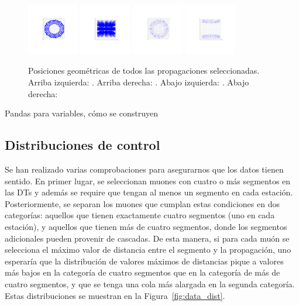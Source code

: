 \begin{figure}
\centering
\includegraphics[width=0.2\textwidth]{figures/Props_DT_xy_postCleaning.png}
\includegraphics[width=0.2\textwidth]{figures/Props_DT_xz_boarders.png}
\includegraphics[width=0.2\textwidth]{figures/Props_CSC_xy_boarders.png}
\includegraphics[width=0.2\textwidth]{figures/Props_CSC_xz_boarders.png}
\caption{Posiciones geom\'etricas de todos las propagaciones seleccionadas. Arriba izquierda: . Arriba derecha: . Abajo izquierda: . Abajo derecha: }
\label{fig:props_pos}
\end{figure}


Pandas para variables, c\'omo se construyen


\subsection{Distribuciones de control}\label{sec:plots}

Se han realizado varias comprobaciones para asegurarnos que los datos tienen sentido. En primer lugar, se seleccionan muones con cuatro o m\'as segmentos en las DTs y adem\'as se require que tengan al menos un segmento en cada estaci\'on. Posteriormente, se separan los muones que cumplan estas condiciones en dos categor\'ias: aquellos que tienen exactamente cuatro segmentos (uno en cada estaci\'on), y aquellos que tienen m\'as de cuatro segmentos, donde los segmentos adicionales pueden provenir de cascadas. De esta manera, si para cada mu\'on se selecciona el m\'aximo valor de distancia entre el segmento y la propagaci\'on, uno esperar\'ia que la distribuci\'on de valores m\'aximos de distancias pique a valores m\'as bajos en la categor\'ia de cuatro segmentos que en la categor\'ia de m\'as de cuatro segmentos, y que se tenga una cola m\'as alargada en la segunda categor\'ia. Estas distribuciones se muestran en la Figura~\ref{fig:data_dist}.

